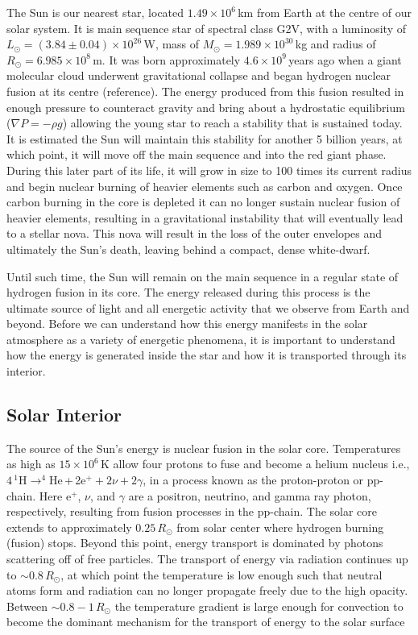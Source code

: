 The Sun is our nearest star, located $1.49\times10^6$\,km from Earth at the centre of our solar system. It is main sequence star of spectral class G2V, with a luminosity of $L_{\odot}=(3.84\pm 0.04)\times10^{26}$\,W, mass of $M_{\odot}=1.989\times10^{30}$\,kg and radius of $R_{\odot}=6.985\times10^8$\,m. It was born approximately $4.6 \times 10^9$\,years ago when a giant molecular cloud underwent gravitational collapse and began hydrogen nuclear fusion at its centre (reference). The energy produced from this fusion resulted in enough pressure to counteract gravity and bring about a hydrostatic equilibrium ($\nabla P = -\rho g$) allowing the young star to reach a stability that is sustained today. It is estimated the Sun will maintain this stability for another 5 billion years, at which point, it will move off the main sequence and into the red giant phase. During this later part of its life, it will grow in size to 100 times its current radius and begin nuclear burning of heavier elements such as carbon and oxygen. Once carbon burning in the core is depleted it can no longer sustain nuclear fusion of heavier elements, resulting in a gravitational instability that will eventually lead to a stellar nova. This nova will result in the loss of the outer envelopes and ultimately the Sun's death, leaving behind a compact, dense white-dwarf.

Until such time, the Sun will remain on the main sequence in a regular state of hydrogen fusion in its core. The energy released during this process is the ultimate source of light and all energetic activity that we observe from Earth and beyond. Before we can understand how this energy manifests in the solar atmosphere as a variety of energetic phenomena, it is important to understand how the energy is generated inside the star and how it is transported through its interior.

\subsection{Solar Interior}\label{sec:10}

The source of the Sun's energy is nuclear fusion in the solar core. Temperatures as high as $15\times10^{6}$\,K allow four protons to fuse and become a helium nucleus i.e., $4\,^{1}$H$\rightarrow ^{4}$He\,+\,2e$^{+}+2\nu+2\gamma$, in a process known as the proton-proton or pp-chain. Here e$^+$, $\nu$, and $\gamma$ are a positron, neutrino, and gamma ray photon, respectively, resulting from fusion processes in the pp-chain. The solar core extends to approximately $0.25\,R_{\odot}$ from solar center where hydrogen burning (fusion) stops. Beyond this point, energy transport is dominated by photons scattering off of free particles. The transport of energy via radiation continues up to $\sim0.8\,R_{\odot}$, at which point the temperature is low enough such that neutral atoms form and radiation can no longer propagate freely due to the high opacity. Between $\sim0.8-1\,R_{\odot}$ the temperature gradient is large enough for convection to become the dominant mechanism for the transport of energy to the solar surface

